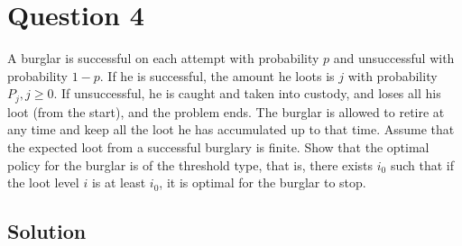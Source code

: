 \section*{Question 4}

A burglar is successful on each attempt with probability \( p \) and unsuccessful with probability \( 1-p \).
If he is successful, the amount he loots is \( j \) with probability \( P_{j}, j \geq 0 \).
If unsuccessful, he is caught and taken into custody, and loses all his loot (from the start), and the problem ends.
The burglar is allowed to retire at any time and keep all the loot he has accumulated up to that time.
Assume that the expected loot from a successful burglary is finite.
Show that the optimal policy for the burglar is of the threshold type, that is, there exists \( i_{0} \) such that if the loot level \( i \) is at least \( i_{0} \), it is optimal for the burglar to stop.

\subsection*{Solution}
